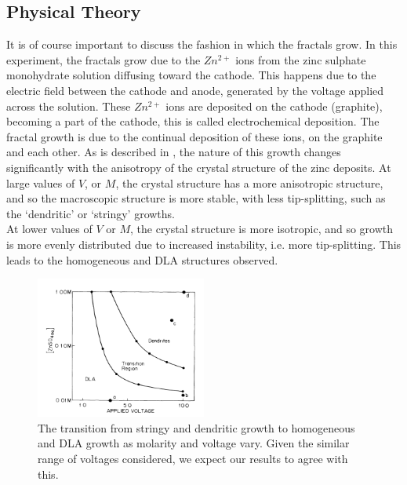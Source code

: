 \documentclass{article}
\theoremstyle{definition}
\theoremstyle{remark}
\begin{document}
\subsection{Physical Theory}\label{sec:physicaltheory}
It is of course important to discuss the fashion in which the fractals grow. In this experiment, the fractals grow due to the $Zn^{2+}$ ions from the zinc sulphate monohydrate solution diffusing toward the cathode. This happens due to the electric field between the cathode and anode, generated by the voltage applied across the solution. These $Zn^{2+}$ ions are deposited on the cathode (graphite), becoming a part of the cathode, this is called electrochemical deposition. The fractal growth is due to the continual deposition of these ions, on the graphite and each other. As is described in \cite{PhysRevLett.59.2315}, the nature of this growth changes significantly with the anisotropy of the crystal structure of the zinc deposits. At large values of $V$, or $M$, the crystal structure has a more anisotropic structure, and so the macroscopic structure is more stable, with less tip-splitting, such as the `dendritic' or `stringy' growths. \\
\indent At lower values of $V$ or $M$, the crystal structure is more isotropic, and so growth is more evenly distributed due to increased instability, i.e. more tip-splitting. This leads to the homogeneous and DLA structures observed.\\
\begin{figure}[H]
        \centering
        \includegraphics[width=0.5\textwidth]{GrieretalFractaltransition.png}
        \caption{\label{fig:fractal transition}The transition from stringy and dendritic growth to homogeneous and DLA growth as molarity and voltage vary. Given the similar range of voltages considered, we expect our results to agree with this. \cite{PhysRevLett.59.2315}}
\end{figure}
\end{document}
